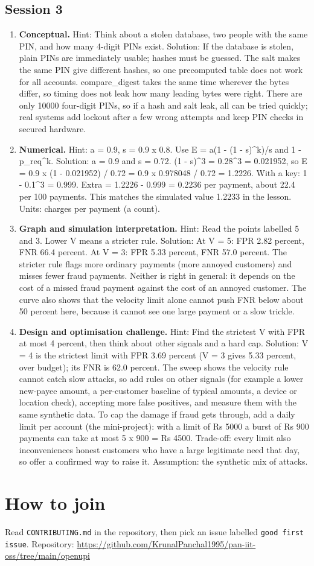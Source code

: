 \documentclass[11pt,a4paper]{article}
\begin{document}
\subsection*{Session 3}
\begin{enumerate}[nosep]
\item \textbf{Conceptual.} Hint: Think about a stolen database, two people with the same PIN, and how many 4-digit PINs exist. Solution: If the database is stolen, plain PINs are immediately usable; hashes must be guessed. The salt makes the same PIN give different hashes, so one precomputed table does not work for all accounts. compare\_digest takes the same time wherever the bytes differ, so timing does not leak how many leading bytes were right. There are only 10000 four-digit PINs, so if a hash and salt leak, all can be tried quickly; real systems add lockout after a few wrong attempts and keep PIN checks in secured hardware.
\item \textbf{Numerical.} Hint: a = 0.9, s = 0.9 x 0.8. Use E = a(1 - (1 - s)\textasciicircum{}k)/s and 1 - p\_req\textasciicircum{}k. Solution: a = 0.9 and s = 0.72. (1 - s)\textasciicircum{}3 = 0.28\textasciicircum{}3 = 0.021952, so E = 0.9 x (1 - 0.021952) / 0.72 = 0.9 x 0.978048 / 0.72 = 1.2226. With a key: 1 - 0.1\textasciicircum{}3 = 0.999. Extra = 1.2226 - 0.999 = 0.2236 per payment, about 22.4 per 100 payments. This matches the simulated value 1.2233 in the lesson. Units: charges per payment (a count).
\item \textbf{Graph and simulation interpretation.} Hint: Read the points labelled 5 and 3. Lower V means a stricter rule. Solution: At V = 5: FPR 2.82 percent, FNR 66.4 percent. At V = 3: FPR 5.33 percent, FNR 57.0 percent. The stricter rule flags more ordinary payments (more annoyed customers) and misses fewer fraud payments. Neither is right in general: it depends on the cost of a missed fraud payment against the cost of an annoyed customer. The curve also shows that the velocity limit alone cannot push FNR below about 50 percent here, because it cannot see one large payment or a slow trickle.
\item \textbf{Design and optimisation challenge.} Hint: Find the strictest V with FPR at most 4 percent, then think about other signals and a hard cap. Solution: V = 4 is the strictest limit with FPR 3.69 percent (V = 3 gives 5.33 percent, over budget); its FNR is 62.0 percent. The sweep shows the velocity rule cannot catch slow attacks, so add rules on other signals (for example a lower new-payee amount, a per-customer baseline of typical amounts, a device or location check), accepting more false positives, and measure them with the same synthetic data. To cap the damage if fraud gets through, add a daily limit per account (the mini-project): with a limit of Rs 5000 a burst of Rs 900 payments can take at most 5 x 900 = Rs 4500. Trade-off: every limit also inconveniences honest customers who have a large legitimate need that day, so offer a confirmed way to raise it. Assumption: the synthetic mix of attacks.
\end{enumerate}

\section{How to join}
Read \texttt{CONTRIBUTING.md} in the repository, then pick an issue labelled \texttt{good first issue}. Repository: \url{https://github.com/KrunalPanchal1995/pan-iit-oss/tree/main/openupi}
\end{document}
